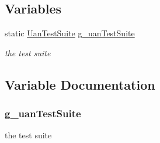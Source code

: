 \subsection*{Variables}
\begin{DoxyCompactItemize}
\item 
static \hyperlink{classUanTestSuite}{Uan\+Test\+Suite} \hyperlink{uan-test_8cc_a9a7467cbd9fb28e84827dffde9e399fb}{g\+\_\+uan\+Test\+Suite}
\begin{DoxyCompactList}\small\item\em the test suite \end{DoxyCompactList}\end{DoxyCompactItemize}


\subsection{Variable Documentation}
\subsubsection[{\texorpdfstring{g\+\_\+uan\+Test\+Suite}{g_uanTestSuite}}]{ g\+\_\+uan\+Test\+Suite\hspace{0.3cm}{\ttfamily [static]}}\hypertarget{uan-test_8cc_a9a7467cbd9fb28e84827dffde9e399fb}{}\label{uan-test_8cc_a9a7467cbd9fb28e84827dffde9e399fb}


the test suite 


